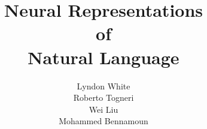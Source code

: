 \documentclass[12pt,parskip]{komatufte}
\begin{document}
\title{Neural Representations \\of\\ Natural Language}
\author{Lyndon White\\ Roberto Togneri\\ Wei Liu\\ Mohammed Bennamoun}
\publishers{SpringerBriefs in Computer Science}


\maketitle

\tableofcontents












\clearpage
{}
\printbibliography
\end{document}
